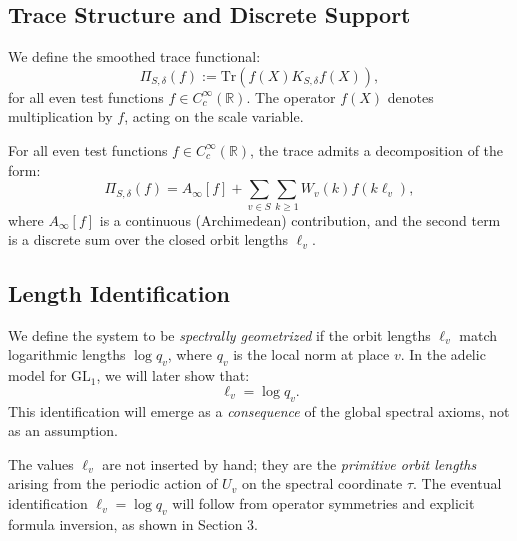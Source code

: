 \subsection{Trace Structure and Discrete Support}

We define the smoothed trace functional:
\[
\Pi_{S,\delta}(f) := \mathrm{Tr} \left( f(X) K_{S,\delta} f(X) \right),
\]
for all even test functions \( f \in C_c^\infty(\mathbb{R}) \). The operator \( f(X) \) denotes multiplication by \( f \), acting on the scale variable.

\begin{assumption}
For all even test functions \( f \in C_c^\infty(\mathbb{R}) \), the trace admits a decomposition of the form:
\[
\Pi_{S,\delta}(f) = A_\infty[f] + \sum_{v \in S} \sum_{k \geq 1} W_v(k) f(k \ell_v),
\]
where \( A_\infty[f] \) is a continuous (Archimedean) contribution, and the second term is a discrete sum over the closed orbit lengths \( \ell_v \).
\end{assumption}

\subsection{Length Identification}

We define the system to be \emph{spectrally geometrized} if the orbit lengths \( \ell_v \) match logarithmic lengths \( \log q_v \), where \( q_v \) is the local norm at place \( v \). In the adelic model for \( \mathrm{GL}_1 \), we will later show that:
\[
\ell_v = \log q_v.
\]
This identification will emerge as a \emph{consequence} of the global spectral axioms, not as an assumption.

\begin{remark}
The values \( \ell_v \) are not inserted by hand; they are the \emph{primitive orbit lengths} arising from the periodic action of \( U_v \) on the spectral coordinate \( \tau \). The eventual identification \( \ell_v = \log q_v \) will follow from operator symmetries and explicit formula inversion, as shown in Section 3.
\end{remark}
